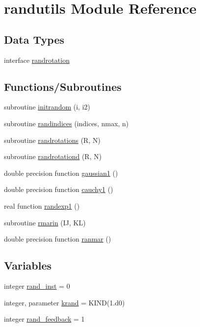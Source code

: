 \hypertarget{namespacerandutils}{}\section{randutils Module Reference}
\label{namespacerandutils}
\subsection*{Data Types}
\begin{DoxyCompactItemize}
\item 
interface \mbox{\hyperlink{interfacerandutils_1_1randrotation}{randrotation}}
\end{DoxyCompactItemize}
\subsection*{Functions/\+Subroutines}
\begin{DoxyCompactItemize}
\item 
subroutine \mbox{\hyperlink{namespacerandutils_a6f074e631d2bdae8023911e26f56d7aa}{initrandom}} (i, i2)
\item 
subroutine \mbox{\hyperlink{namespacerandutils_ad5f2ab70ffa569eab34dede61e38f4a0}{randindices}} (indices, nmax, n)
\item 
subroutine \mbox{\hyperlink{namespacerandutils_ad86fd161689210aee49bc794d76ceda5}{randrotations}} (R, N)
\item 
subroutine \mbox{\hyperlink{namespacerandutils_a2231f6417e95a0e41e8f024aaa89445f}{randrotationd}} (R, N)
\item 
double precision function \mbox{\hyperlink{namespacerandutils_a9279fa2584213af31977f47ef3ea77e7}{gaussian1}} ()
\item 
double precision function \mbox{\hyperlink{namespacerandutils_a6a11e93bb549c94d47ae94f4e6ac8c49}{cauchy1}} ()
\item 
real function \mbox{\hyperlink{namespacerandutils_a4ab2d2d677da8e5a41e18804782dd952}{randexp1}} ()
\item 
subroutine \mbox{\hyperlink{namespacerandutils_ae91e8d9448da0877857bf6ae466c210d}{rmarin}} (IJ, KL)
\item 
double precision function \mbox{\hyperlink{namespacerandutils_a6065ecd619b0a63bceabcecdde031a2c}{ranmar}} ()
\end{DoxyCompactItemize}
\subsection*{Variables}
\begin{DoxyCompactItemize}
\item 
integer \mbox{\hyperlink{namespacerandutils_aaf067b67d4f4be83b834ee102bdd6a22}{rand\+\_\+inst}} = 0
\item 
integer, parameter \mbox{\hyperlink{namespacerandutils_a4a902df9abe9715fa91cccf15f4cfb2f}{krand}} = K\+I\+ND(1.d0)
\item 
integer \mbox{\hyperlink{namespacerandutils_acbcf68b5e32d0ef96da88ca3de39a454}{rand\+\_\+feedback}} = 1
\end{DoxyCompactItemize}


